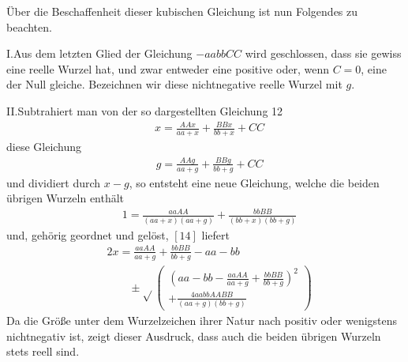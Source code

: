 \begingroup
\renewcommand{\arraystretch}{1.45}

Über die Beschaffenheit dieser kubischen Gleichung ist nun Folgendes zu beachten.

I.\quad Aus dem letzten Glied der Gleichung \(-aabbCC\) wird geschlossen, dass sie gewiss eine reelle Wurzel hat, und zwar entweder eine positive oder, wenn \(C=0\), eine der Null gleiche. Bezeichnen wir diese nichtnegative reelle Wurzel mit \(g\).

II.\quad Subtrahiert man von der so dargestellten Gleichung 12
\[
\begin{aligned}
&x=\frac{AAx}{aa+x}+\frac{BBx}{bb+x}+CC
\end{aligned}
\]
diese Gleichung\textperiodcentered
\[
\begin{aligned}
&g=\frac{AAg}{aa+g}+\frac{BBg}{bb+g}+CC
\end{aligned}
\]
und dividiert durch \(x-g\), so entsteht eine neue Gleichung, welche die beiden übrigen Wurzeln enthält
\[
\begin{aligned}
&1=\frac{aaAA}{(aa+x)(aa+g)}+\frac{bbBB}{(bb+x)(bb+g)}
\end{aligned}
\]
und, gehörig geordnet und gelöst, \([14]\) liefert
\[
\begin{aligned}
&2x=\frac{aaAA}{aa+g}+\frac{bbBB}{bb+g}-aa-bb\\[6pt]
&\qquad{}\pm\surd\!\left(\begin{gathered}\left(aa-bb-\frac{aaAA}{aa+g}+\frac{bbBB}{bb+g}\right)^2
\\[6pt]+\frac{4aabbAABB}{(aa+g)(bb+g)}\end{gathered}\right)
\end{aligned}
\]
Da die Größe unter dem Wurzelzeichen ihrer Natur nach positiv oder wenigstens nichtnegativ ist, zeigt dieser Ausdruck, dass auch die beiden übrigen Wurzeln stets reell sind.

